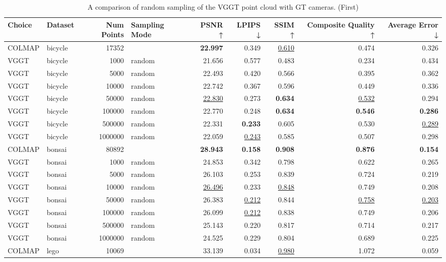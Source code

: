 \begin{table}[H]
\caption{A comparison of random sampling of the VGGT point cloud with GT cameras. (First)}
\label{tab:03_random_gt_cams_first}
\small
\begin{tabular}{llrlrrrrr}
\toprule
Choice & Dataset & Num Points & Sampling Mode & PSNR ↑ & LPIPS ↓ & SSIM ↑ & Composite Quality ↑ & Average Error ↓ \\
\midrule
COLMAP & bicycle & 17352 &  & \textbf{22.997} & 0.349 & \underline{0.610} & 0.474 & 0.326 \\
VGGT & bicycle & 1000 & random & 21.656 & 0.577 & 0.483 & 0.234 & 0.434 \\
VGGT & bicycle & 5000 & random & 22.493 & 0.420 & 0.566 & 0.395 & 0.362 \\
VGGT & bicycle & 10000 & random & 22.742 & 0.367 & 0.596 & 0.449 & 0.336 \\
VGGT & bicycle & 50000 & random & \underline{22.830} & 0.273 & \textbf{0.634} & \underline{0.532} & 0.294 \\
VGGT & bicycle & 100000 & random & 22.770 & 0.248 & \textbf{0.634} & \textbf{0.546} & \textbf{0.286} \\
VGGT & bicycle & 500000 & random & 22.331 & \textbf{0.233} & 0.605 & 0.530 & \underline{0.289} \\
VGGT & bicycle & 1000000 & random & 22.059 & \underline{0.243} & 0.585 & 0.507 & 0.298 \\
\midrule
COLMAP & bonsai & 80892 &  & \textbf{28.943} & \textbf{0.158} & \textbf{0.908} & \textbf{0.876} & \textbf{0.154} \\
VGGT & bonsai & 1000 & random & 24.853 & 0.342 & 0.798 & 0.622 & 0.265 \\
VGGT & bonsai & 5000 & random & 26.103 & 0.253 & 0.839 & 0.724 & 0.219 \\
VGGT & bonsai & 10000 & random & \underline{26.496} & 0.233 & \underline{0.848} & 0.749 & 0.208 \\
VGGT & bonsai & 50000 & random & 26.383 & \underline{0.212} & 0.844 & \underline{0.758} & \underline{0.203} \\
VGGT & bonsai & 100000 & random & 26.099 & \underline{0.212} & 0.838 & 0.749 & 0.206 \\
VGGT & bonsai & 500000 & random & 25.143 & 0.220 & 0.817 & 0.714 & 0.217 \\
VGGT & bonsai & 1000000 & random & 24.525 & 0.229 & 0.804 & 0.689 & 0.225 \\
\midrule
COLMAP & lego & 10069 &  & 33.139 & 0.034 & \underline{0.980} & 1.072 & 0.059 \\

\end{tabular}
\end{table}
